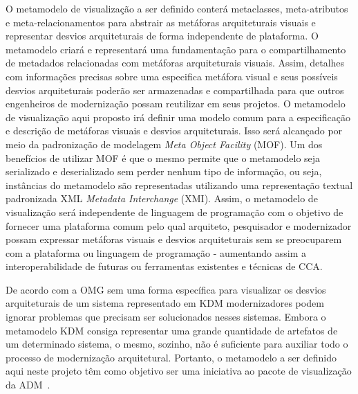\documentclass[12pt]{article}
\begin{document}
O metamodelo de visualização a ser definido conterá metaclasses, meta-atributos e meta-relacionamentos para abstrair as metáforas arquiteturais visuais e representar desvios arquiteturais de forma independente de plataforma. O metamodelo criará e representará uma fundamentação para o compartilhamento de metadados relacionadas com metáforas arquiteturais visuais. Assim, detalhes com informações precisas sobre uma especifica metáfora visual e seus possíveis desvios arquiteturais poderão ser armazenadas e compartilhada para que outros engenheiros de modernização possam reutilizar em seus projetos. O metamodelo de visualização aqui proposto irá definir uma modelo comum para a especificação e descrição de metáforas visuais e desvios arquiteturais. Isso será alcançado por meio da padronização de modelagem \textit{Meta Object Facility} (MOF). Um dos benefícios de utilizar MOF é que o mesmo permite que o metamodelo seja serializado e deserializado sem perder nenhum tipo de informação, ou seja, instâncias do metamodelo são representadas utilizando uma representação textual padronizada XML \textit{Metadata Interchange} (XMI). Assim, o metamodelo de visualização será independente de linguagem de programação com o objetivo de fornecer uma plataforma comum pelo qual arquiteto, pesquisador e modernizador possam expressar metáforas visuais e desvios arquiteturais sem se preocuparem com a plataforma ou linguagem de programação - aumentando assim a interoperabilidade de futuras ou ferramentas existentes e técnicas de CCA.

De acordo com a OMG sem uma forma específica para visualizar os desvios arquiteturais de um sistema representado em KDM modernizadores podem ignorar problemas que precisam ser solucionados nesses sistemas. Embora o metamodelo KDM consiga representar uma grande quantidade de artefatos de um determinado sistema, o mesmo, sozinho, não é suficiente para auxiliar todo o processo de modernização arquitetural. Portanto, o metamodelo a ser definido aqui neste projeto têm como objetivo ser uma iniciativa ao pacote de visualização da ADM~\cite{ADM:visualization}.
\end{document}
